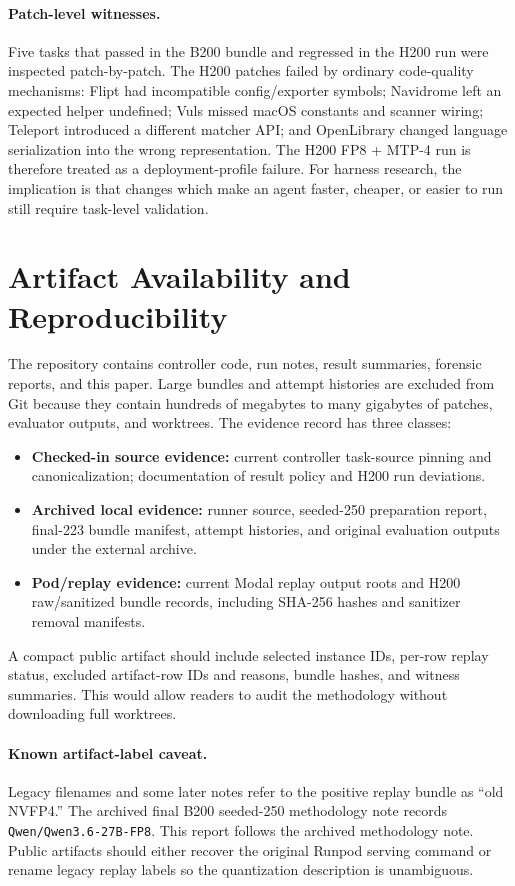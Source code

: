 \documentclass[11pt]{article}
\begin{document}
\paragraph{Patch-level witnesses.}
Five tasks that passed in the B200 bundle and regressed in the H200 run were inspected patch-by-patch. The H200 patches failed by ordinary code-quality mechanisms: Flipt had incompatible config/exporter symbols; Navidrome left an expected helper undefined; Vuls missed macOS constants and scanner wiring; Teleport introduced a different matcher API; and OpenLibrary changed language serialization into the wrong representation. The H200 FP8 + MTP-4 run is therefore treated as a deployment-profile failure. For harness research, the implication is that changes which make an agent faster, cheaper, or easier to run still require task-level validation.

\section{Artifact Availability and Reproducibility}

The repository contains controller code, run notes, result summaries, forensic reports, and this paper. Large bundles and attempt histories are excluded from Git because they contain hundreds of megabytes to many gigabytes of patches, evaluator outputs, and worktrees. The evidence record has three classes:

\begin{itemize}
  \item \textbf{Checked-in source evidence:} current controller task-source pinning and canonicalization; documentation of result policy and H200 run deviations.
  \item \textbf{Archived local evidence:} runner source, seeded-250 preparation report, final-223 bundle manifest, attempt histories, and original evaluation outputs under the external archive.
  \item \textbf{Pod/replay evidence:} current Modal replay output roots and H200 raw/sanitized bundle records, including SHA-256 hashes and sanitizer removal manifests.
\end{itemize}

A compact public artifact should include selected instance IDs, per-row replay status, excluded artifact-row IDs and reasons, bundle hashes, and witness summaries. This would allow readers to audit the methodology without downloading full worktrees.

\paragraph{Known artifact-label caveat.}
Legacy filenames and some later notes refer to the positive replay bundle as ``old NVFP4.'' The archived final B200 seeded-250 methodology note records \texttt{Qwen/Qwen3.6-27B-FP8}. This report follows the archived methodology note. Public artifacts should either recover the original Runpod serving command or rename legacy replay labels so the quantization description is unambiguous.
\end{document}

